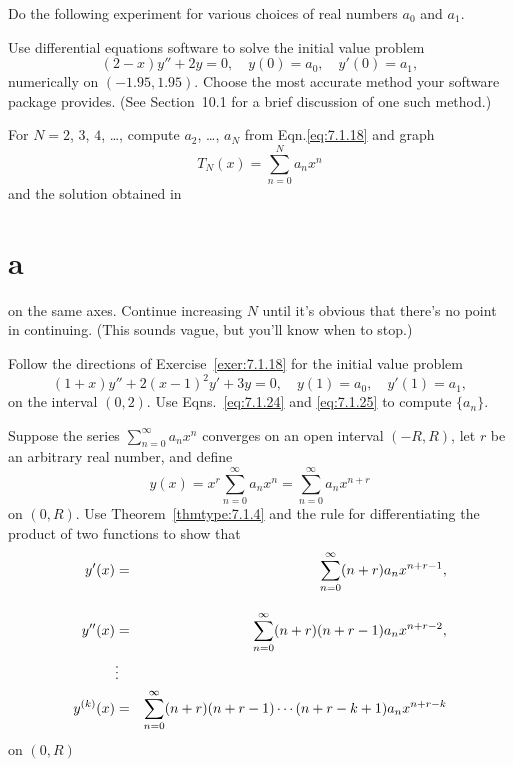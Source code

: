 \begin{exerciselist}
  \item\label{exer:7.1.18} \Lex Do the following experiment for various choices of real numbers
        $a_{0}$ and $a_{1}$.
  \begin{alist}
    \item %
    Use differential equations software to solve the initial value problem
    \[
      (2-x)y''+2y=0,\quad y(0)=a_{0},\quad y'(0)=a_{1},
    \]
    numerically on $(-1.95,1.95)$. Choose the most accurate method your software package provides.
    (See Section~10.1 for a brief discussion of one such method.)

    \item %
    For $N=2$, $3$, $4$, \dots, compute $a_{2}$, \dots, $a_{N}$ from Eqn.\eqref{eq:7.1.18} and graph
    \[
      T_{N}(x)=\sum_{n=0}^{N}a_{n}x^{n}
    \]
    and the solution obtained in \part{a} on the same axes. Continue increasing $N$ until it's
    obvious that there's no point in continuing. (This sounds vague, but you'll know when to stop.)
  \end{alist}

  \item\label{exer:7.1.19} \Lex Follow the directions of Exercise~\ref{exer:7.1.18} for the initial
        value problem
  \[
    (1+x)y''+2(x-1)^{2}y'+3y=0,\quad y(1)=a_{0},\quad y'(1)=a_{1},
  \]
  on the interval $(0,2)$. Use Eqns.~\eqref{eq:7.1.24} and \eqref{eq:7.1.25} to compute $\{a_{n}\}$.

  \item\label{exer:7.1.20} Suppose the series $\sum_{n=0}^{\infty}a_{n}x^{n}$ converges on an open
        interval $(-R,R)$, let $r$ be an arbitrary real number, and define
  \[
    y(x)=x^{r}\sum_{n=0}^{\infty}a_{n}x^{n}=\sum_{n=0}^{\infty}a_{n}x^{n+r}
  \]
  on $(0,R)$. Use Theorem~\ref{thmtype:7.1.4} and the rule for differentiating the product of two
  functions to show that
  \begin{eqnarray*}
    y'(x)      & =      & \displaystyle{\sum_{n=0}^{\infty}(n+r)a_{n}x^{n+r-1}},        \\[10pt]
    y''(x)     & =      & \displaystyle{\sum_{n=0}^{\infty}(n+r)(n+r-1)a_{n}x^{n+r-2}}, \\
               & \vdots &                                                      \\
    y^{(k)}(x) & =      & \displaystyle{\sum_{n=0}^{\infty}(n+r)(n+r-1)\cdots(n+r-k+1)a_{n}x^{n+r-k}}
  \end{eqnarray*}
  on $(0,R)$


\end{exerciselist}
